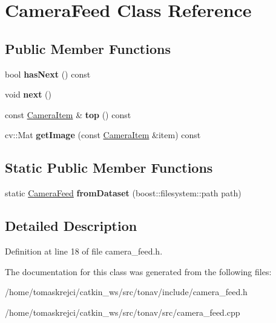 \hypertarget{class_camera_feed}{\section{Camera\-Feed Class Reference}
\label{class_camera_feed}
}
\subsection*{Public Member Functions}
\begin{DoxyCompactItemize}
\item 
\hypertarget{class_camera_feed_a2d7c8c329802b64568b312675115efce}{bool {\bfseries has\-Next} () const }\label{class_camera_feed_a2d7c8c329802b64568b312675115efce}

\item 
\hypertarget{class_camera_feed_a175a707efb56c2f3c78c2859129cbc24}{void {\bfseries next} ()}\label{class_camera_feed_a175a707efb56c2f3c78c2859129cbc24}

\item 
\hypertarget{class_camera_feed_ac703c1de71a7bf488f82921177ea4b0a}{const \hyperlink{class_camera_item}{Camera\-Item} \& {\bfseries top} () const }\label{class_camera_feed_ac703c1de71a7bf488f82921177ea4b0a}

\item 
\hypertarget{class_camera_feed_af761420a0337f52253b23c7d276516f8}{cv\-::\-Mat {\bfseries get\-Image} (const \hyperlink{class_camera_item}{Camera\-Item} \&item) const }\label{class_camera_feed_af761420a0337f52253b23c7d276516f8}

\end{DoxyCompactItemize}
\subsection*{Static Public Member Functions}
\begin{DoxyCompactItemize}
\item 
\hypertarget{class_camera_feed_a38c0ad4632b39babdc99fc65ddc56c36}{static \hyperlink{class_camera_feed}{Camera\-Feed} {\bfseries from\-Dataset} (boost\-::filesystem\-::path path)}\label{class_camera_feed_a38c0ad4632b39babdc99fc65ddc56c36}

\end{DoxyCompactItemize}


\subsection{Detailed Description}


Definition at line 18 of file camera\-\_\-feed.\-h.



The documentation for this class was generated from the following files\-:\begin{DoxyCompactItemize}
\item 
/home/tomaskrejci/catkin\-\_\-ws/src/tonav/include/camera\-\_\-feed.\-h\item 
/home/tomaskrejci/catkin\-\_\-ws/src/tonav/src/camera\-\_\-feed.\-cpp\end{DoxyCompactItemize}
